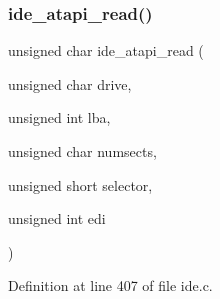 \mbox{\label{a00032_a1652da42785708fa6ea21ce4aef8c628_a1652da42785708fa6ea21ce4aef8c628}} 
\subsubsection{\texorpdfstring{ide\+\_\+atapi\+\_\+read()}{ide\_atapi\_read()}}
{\footnotesize\ttfamily unsigned char ide\+\_\+atapi\+\_\+read (\begin{DoxyParamCaption}\item[{unsigned char}]{drive,  }\item[{unsigned int}]{lba,  }\item[{unsigned char}]{numsects,  }\item[{unsigned short}]{selector,  }\item[{unsigned int}]{edi }\end{DoxyParamCaption})}



Definition at line 407 of file ide.\+c.


